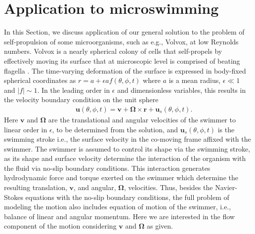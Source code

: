\documentclass[aps,prx,twocolumn,amsmath,amssymb,amsfonts]{revtex4-2}
\begin{document}
{{\section{Application to microswimming} \label{mco}

In this Section, we discuss application of our general solution to the problem of self-propulsion of some microorganisms, such as e.g., Volvox, at low Reynolds numbers. Volvox is a nearly spherical colony of cells that self-propels by effectively moving its surface that at microscopic level is comprised of beating flagella \cite{volvox}. The time-varying deformation of the surface is expressed in body-fixed spherical coordinates as $r=a+\epsilon a f(\theta, \phi, t)$ where $a$ is a mean radius, $\epsilon\ll 1$ and $|f|\sim 1$. In the leading order in $\epsilon$ and dimensionless variables, this results in the velocity boundary condition on the unit sphere
\begin{eqnarray}&&\!\!\!\!\!\!\!
\bm u(\theta, \phi, t)\!=\!\bm v\!+\!\bm \Omega\!\times\!\bm r\!+\!\bm u_s(\theta, \phi, t).
\end{eqnarray}
Here $\bm v$ and $\bm \Omega$ are the translational and angular velocities of the swimmer to linear order in $\epsilon$, to be determined from the solution, and $\bm u_s(\theta, \phi, t)$ is the swimming stroke i.e., the surface velocity in the co-moving frame affixed with the swimmer. The swimmer is assumed to control its shape via the swimming stroke, as its shape and surface velocity determine the interaction of the organism with the fluid via no-slip boundary conditions. This interaction generates hydrodynamic force and torque exerted on the swimmer which determine the resulting translation, $\bm v$, and angular, $\bm \Omega$, velocities. Thus, besides the Navier-Stokes equations with the no-slip boundary conditions, the full problem of modeling the motion also includes equation of motion of the swimmer, i.e., balance of linear and angular momentum. Here we are interested in the flow component of the motion considering $\bm v$ and $\bm \Omega$ as given.

}}
\end{document}
